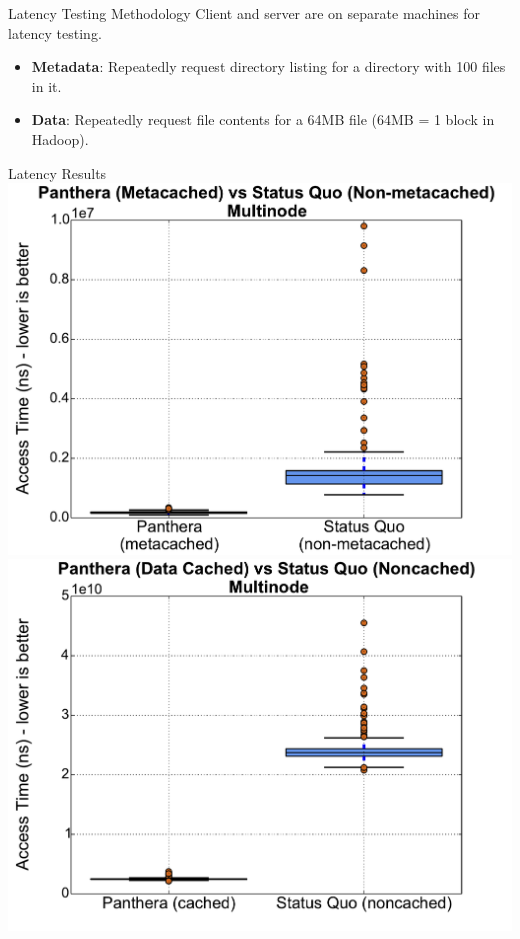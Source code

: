 \documentclass[final]{beamer} %
\begin{document}
\begin{frame}
\begin{columns}[t]
\begin{column}{0.32\textwidth}
	\begin{block}{Latency Testing Methodology}
	Client and server are on separate machines for latency testing.
	\begin{itemize}
		\item \textbf{Metadata}: Repeatedly request directory listing for a directory with 100 files in it.
		\item \textbf{Data}: Repeatedly request file contents for a 64MB file (64MB = 1 block in Hadoop).
	\end{itemize}

	\end{block}
		\begin{block}{Latency Results}
		\vspace{1em}
		\includegraphics[scale=1]{assets/v2/multinode_meta_box_plot.pdf}
		\vspace{1.5em}
		\includegraphics[scale=0.98]{assets/v2/getter_boxplot.pdf}
	\end{block}
	

\end{column}
\end{columns}
\end{frame}
\end{document}
